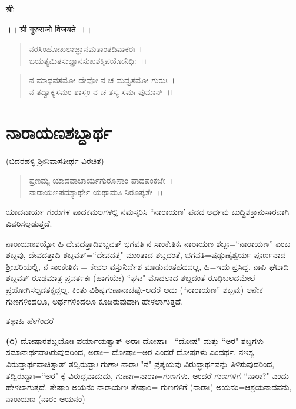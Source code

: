 

\begin{center}
श्रीः
\end{center}

\begin{center}
।। श्री गुरुराजो विजयते~।।
\end{center}

\begin{verse}
ನರಸಿಂಹೋಖಲಾಜ್ಞಾನಮತಾಂತದಿವಾಕರಃ~।\\ ಜಯತ್ಯಮಿತಸುಜ್ಞಾನಸುಖಶಕ್ತಿಪಯೋನಿಧಿ:~।।
\end{verse}

\begin{verse}
ನ ಮಾಧವಸಮೋ ದೇವೋ ನ ಚ ಮಧ್ವಸಮೋ ಗುರುಃ~।\\ ನ ತದ್ವಾಕ್ಯಸಮಂ ಶಾಸ್ತಂ ನ ಚ ತಸ್ಯ ಸಮಃ ಪುಮಾನ್~।।
\end{verse}

\chapter{ನಾರಾಯಣಶಬ್ದಾರ್ಥ}

\begin{center}
(ಬಿದರಹಳ್ಳಿ ಶ‍್ರೀನಿವಾಸತೀರ್ಥ ವಿರಚಿತ)
\end{center}

\begin{verse}
 ಪ್ರಣಮ್ಯ ಯಾದವಾಚಾರ್ಯಗುರೂಣಾಂ ಪಾದಪಂಕಜೇ~।\\ ನಾರಾಯಣಪದಸ್ಯಾರ್ಥೇ ಯಥಾಮತಿ ನಿರೂಪ್ಯತೇ~।।
\end{verse}

ಯಾದವಾರ್ಯ ಗುರುಗಳ ಪಾದಕಮಲಗಳಲ್ಲಿ ನಮಸ್ಕರಿಸಿ “ನಾರಾಯಣ' ಪದದ ಅರ್ಥವು ಬುದ್ಧಿಶಕ್ತಾನುಸಾರವಾಗಿ ವಿವರಿಸಲ್ಪಡುತ್ತದೆ.

ನಾರಾಯಣಶಯ್ಯೋ ಹಿ ದೇವದತ್ತಾದಿಶಬ್ದವತ್ ಭಗವತಿ ನ ಸಾಂಕೇತಿಕಃ ನಾರಾಯಣ ಶಬ್ದಃ=``ನಾರಾಯಣ'' ಎಂಬ ಶಬ್ದವು, ದೇವದತ್ತಾದಿ ಶಬ್ದವತ್=``ದೇವದತ್ತ" ಮುಂತಾದ ಶಬ್ದದಂತೆ, ಭಗವತಿ=ಷಡ್ಗುಣೈಶ್ವರ್ಯ ಪೂರ್ಣನಾದ ಶ‍್ರೀಹರಿಯಲ್ಲಿ, ನ ಸಾಂಕೇತಿಕಃ = ಕೇವಲ ವಸ್ತುನಿರ್ದೆಶ ಮಾಡುವಂತಹದದಲ್ಲ, ಹಿ=ಇದು ಪ್ರಸಿದ್ದ, ನಾಪಿ ಘಟಾದಿ ಶಬ್ದವತ್ ರೂಢಮಾತ್ರ ಪ್ರವರ್ತಕಃ-(ಹಾಗೆಯೇ) ``ಘಟ" ಮೊದಲಾದ ಶಬ್ದದಂತೆ ರೂಢಿಬಲದಮೇಲೆ ಪ್ರಯೋಗಿಸಲ್ಪಡತಕ್ಕದ್ದಲ್ಲ. ಕಿಂತು ವಿಶಿಷ್ಟಗುಣಾನಾಚಷ್ಟೇ-ಆದರೆ ಅದು (``ನಾರಾಯಣ'' ಶಬ್ದವು) ಅನೇಕ ಗುಣಗಳಿಂದಲೂ, ಅರ್ಥಗಳಿಂದಲೂ ಕೂಡಿರುವುದಾಗಿ ಹೇಳಲಾಗುತ್ತದೆ.

\noindent
ತಥಾಹಿ-ಹೇಗೆಂದರೆ -

\textbf{(೧)} ದೋಷಾರಶಬ್ದಯೋಃ ಪರ್ಯಾಯತ್ವಾತ್ ಅರಾಃ ದೋಷಾಃ - ``ದೋಷ" ಮತ್ತು ``ಅರ" ಶಬ್ದಗಳು ಸಮಾನಾರ್ಥವಾಗಿರುವುದರಿಂದ, ಅರಾಃ= ದೋಷಾಃ=ಅರ ಎಂದರೆ ದೋಷಗಳು ಎಂದರ್ಥ. ನಇಶ್ಯ ವಿರುದ್ಧಾರ್ಥವಾಚಿತ್ವಾತ್ ತದ್ವಿರುದ್ದಾಃ ಗುಣಾಃ ನಾರಾಃ-"ನ" ಪ್ರತ್ಯಯವು ವಿರುದ್ಧಾರ್ಥವನ್ನು ತಿಳಿಸುವುದರಿಂದ, ತದ್ವಿರುದ್ದಾಃ=``ಅರ" ಕ್ಕೆ ವಿರುದ್ದವಾದುದು, ಗುಣಾಃ=ನಾರಾಃ=ಗುಣಗಳು. ಅಂದರೆ ಗುಣಗಳಿಗೆ ``ನಾರಾ?" ಎಂದು ಹೇಳಲಾಗುತ್ತದೆ. ತೇಷಾಂ ಅಯನಂ ನಾರಾಯಣಃ-ತೇಷಾ೦= ಗುಣಗಳಿಗೆ (ನಾರಾಃ) ಅಯನಂ=ಆಶ್ರಯನಾದವನು, ನಾರಾಯಣ (ನಾರಂ ಅಯನಂ)

